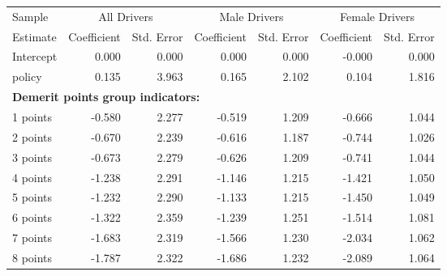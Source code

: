 
\begin{table}%
\centering 
\begin{tabular}{l r r r r r r} 

\hline 
 

Sample 
 & \multicolumn{2}{c}{All  Drivers}  & \multicolumn{2}{c}{Male  Drivers}  & \multicolumn{2}{c}{Female  Drivers}   \\ 
 

 \cmidrule(lr){1-1}\cmidrule(lr){2-3}\cmidrule(lr){4-5}\cmidrule(lr){6-7} 

Estimate  & Coefficient & Std. Error  & Coefficient & Std. Error  & Coefficient & Std. Error   \\ 
 

\hline 
 
Intercept  &  0.000  &  0.000  &  0.000  &  0.000  & -0.000  &  0.000   \\ 
 
policy  &  0.135  &  3.963  &  0.165  &  2.102  &  0.104  &  1.816   \\ 
 

\hline 
 
\multicolumn{4}{l}{\textbf{Demerit points group indicators:}}  \\ 
 
1 points  & -0.580  &  2.277  & -0.519  &  1.209  & -0.666  &  1.044   \\ 
 
2 points  & -0.670  &  2.239  & -0.616  &  1.187  & -0.744  &  1.026   \\ 
 
3 points  & -0.673  &  2.279  & -0.626  &  1.209  & -0.741  &  1.044   \\ 
 
4 points  & -1.238  &  2.291  & -1.146  &  1.215  & -1.421  &  1.050   \\ 
 
5 points  & -1.232  &  2.290  & -1.133  &  1.215  & -1.450  &  1.049   \\ 
 
6 points  & -1.322  &  2.359  & -1.239  &  1.251  & -1.514  &  1.081   \\ 
 
7 points  & -1.683  &  2.319  & -1.566  &  1.230  & -2.034  &  1.062   \\ 
 
8 points  & -1.787  &  2.322  & -1.686  &  1.232  & -2.089  &  1.064   \\ 
 

\end{tabular}
\end{table}

